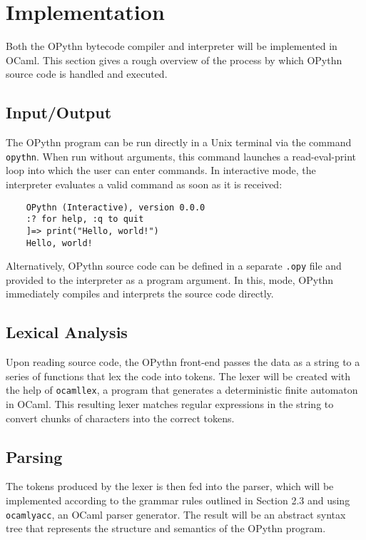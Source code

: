 \documentclass[11pt, twoside]{article}
\begin{document}
\section{Implementation}
Both the OPythn bytecode compiler and interpreter will be implemented in OCaml. This section gives a rough overview of the process by which OPythn source code is handled and executed.
    \subsection{Input/Output}
    The OPythn program can be run directly in a Unix terminal via the command \texttt{opythn}. When run without arguments, this command launches a read-eval-print loop into which the user can enter commands. In interactive mode, the interpreter evaluates a valid command as soon as it is received:
    \begin{lstlisting}
    OPythn (Interactive), version 0.0.0
    :? for help, :q to quit
    ]=> print("Hello, world!")
    Hello, world!
    \end{lstlisting}
    Alternatively, OPythn source code can be defined in a separate \texttt{.opy} file and provided to the interpreter as a program argument. In this, mode, OPythn immediately compiles and interprets the source code directly.
    \subsection{Lexical Analysis}
    Upon reading source code, the OPythn front-end passes the data as a string to a series of functions that lex the code into tokens. The lexer will be created with the help of \texttt{ocamllex}, a program that generates a deterministic finite automaton in OCaml. This resulting lexer matches regular expressions in the string to convert chunks of characters into the correct tokens. 
    \subsection{Parsing}
    The tokens produced by the lexer is then fed into the parser, which will be implemented according to the grammar rules outlined in Section 2.3 and using \texttt{ocamlyacc}, an OCaml parser generator. The result will be an abstract syntax tree that represents the structure and semantics of the OPythn program. 
\end{document}
